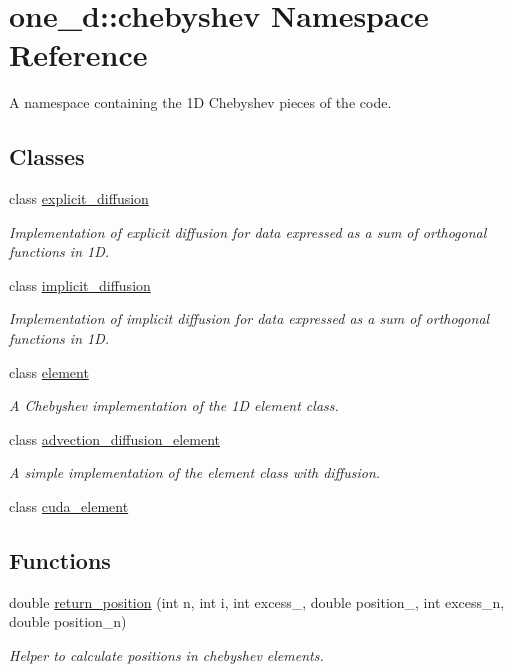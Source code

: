 \hypertarget{namespaceone__d_1_1chebyshev}{\section{one\-\_\-d\-:\-:chebyshev Namespace Reference}
\label{namespaceone__d_1_1chebyshev}
}


A namespace containing the 1\-D Chebyshev pieces of the code.  


\subsection*{Classes}
\begin{DoxyCompactItemize}
\item 
class \hyperlink{classone__d_1_1chebyshev_1_1explicit__diffusion}{explicit\-\_\-diffusion}
\begin{DoxyCompactList}\small\item\em Implementation of explicit diffusion for data expressed as a sum of orthogonal functions in 1\-D. \end{DoxyCompactList}\item 
class \hyperlink{classone__d_1_1chebyshev_1_1implicit__diffusion}{implicit\-\_\-diffusion}
\begin{DoxyCompactList}\small\item\em Implementation of implicit diffusion for data expressed as a sum of orthogonal functions in 1\-D. \end{DoxyCompactList}\item 
class \hyperlink{classone__d_1_1chebyshev_1_1element}{element}
\begin{DoxyCompactList}\small\item\em A Chebyshev implementation of the 1\-D element class. \end{DoxyCompactList}\item 
class \hyperlink{classone__d_1_1chebyshev_1_1advection__diffusion__element}{advection\-\_\-diffusion\-\_\-element}
\begin{DoxyCompactList}\small\item\em A simple implementation of the element class with diffusion. \end{DoxyCompactList}\item 
class \hyperlink{classone__d_1_1chebyshev_1_1cuda__element}{cuda\-\_\-element}
\end{DoxyCompactItemize}
\subsection*{Functions}
\begin{DoxyCompactItemize}
\item 
double \hyperlink{namespaceone__d_1_1chebyshev_af9ab281bbb058d20bea1ec47a68ca7dd}{return\-\_\-position} (int n, int i, int excess\-\_, double position\-\_, int excess\-\_\-n, double position\-\_\-n)
\begin{DoxyCompactList}\small\item\em Helper to calculate positions in chebyshev elements. \end{DoxyCompactList}\end{DoxyCompactItemize}


